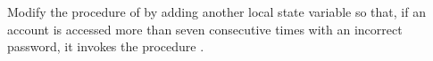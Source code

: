 \begin{exercise}
	\label{Exercise 3.4}
	Modify the  procedure of  by adding another local state variable so that, if an account is accessed more than seven consecutive times with an incorrect password, it invokes the procedure .
\end{exercise}

